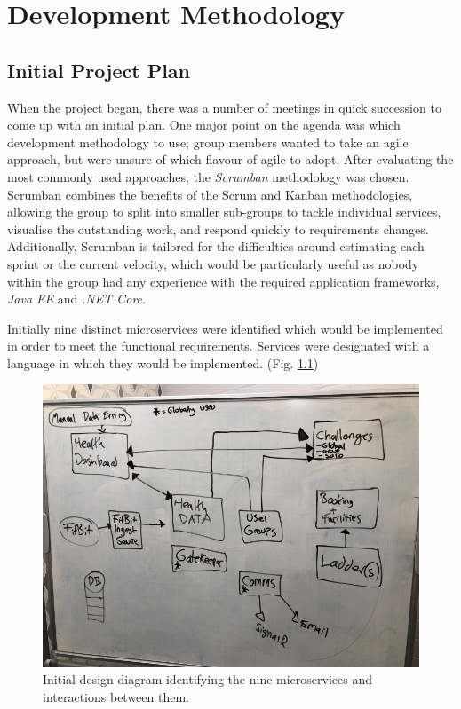 \chapter{Development Methodology}

\section{Initial Project Plan}
When the project began, there was a number of meetings in quick succession to come up with an initial plan. One major point on the agenda was which development methodology to use; group members wanted to take an agile approach, but were unsure of which flavour of agile to adopt. After evaluating the most commonly used approaches, the \textit{Scrumban}\cite{scrumban} methodology was chosen. Scrumban combines the benefits of the Scrum and Kanban methodologies, allowing the group to split into smaller sub-groups to tackle individual services, visualise the outstanding work, and respond quickly to requirements changes. Additionally, Scrumban is tailored for the difficulties around estimating each sprint or the current velocity, which would be particularly useful as nobody within the group had any experience with the required application frameworks, \textit{Java EE} and \textit{.NET Core}.

Initially nine distinct microservices were identified which would be implemented in order to meet the functional requirements. Services were designated with a language in which they would be implemented. (Fig. \ref{fig:initial_spec_chart})

\begin{figure}[H]
    \centering
    \includegraphics[width=\textwidth]{Images/Initial_Spec_Chart.jpg}
    \caption{Initial design diagram identifying the nine microservices and interactions between them.}
    \label{fig:initial_spec_chart}
\end{figure}

